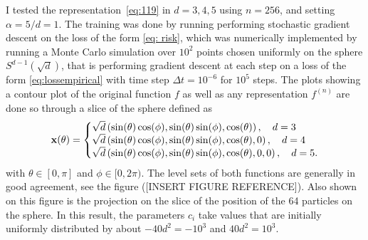\documentclass{article}
\begin{document}
I tested the representation~\eqref{eq:119} in $d=3,4,5$ using $n=256$, and setting $\alpha = 5/d= 1$. The training was done
by running performing stochastic gradient descent on the loss of the form \ref{eq: risk}, which was numerically implemented by running a Monte Carlo simulation over $ 10^2$ points chosen uniformly on the sphere $ S^{d-1}(\sqrt{d})$, that is performing gradient descent at each step on a loss of the form \ref{eq:lossempirical} with
time step $\Delta t = 10^{-6}$ for $10^5$ steps. The plots
showing a contour plot of the original function $f$
as well as any representation $f^{(n)}$ are done so through a slice of the
sphere defined as
%
\begin{equation}
  \label{eq:slice}
  \mathbf{x}(\theta) =\left\lbrace
  \begin{array}{@{}l@{}}
       \sqrt{d} \left(\sin(\theta)\cos(\phi),
    \sin(\theta)\sin(\phi),
    \cos(\theta)\right), \quad d = 3\\
\sqrt{d} \left(\sin(\theta)\cos(\phi),
    \sin(\theta)\sin(\phi),
    \cos(\theta),0\right), \quad d = 4\\
      \sqrt{d} \left(\sin(\theta)\cos(\phi),
    \sin(\theta)\sin(\phi),
    \cos(\theta),0,0\right), \quad d = 5.
  \end{array}\right. 
\end{equation}%
with $\theta\in[0,\pi]$ and $\phi\in [0,2\pi)$. The level sets of both functions are generally in good agreement, see the figure ([INSERT FIGURE REFERENCE]). Also shown on
this figure is the projection on the slice of the position of the 64
particles on the sphere. In this result, the parameters $c_i$ take
values that are initially uniformly distributed by about
$-40 d^2 = -10^3$ and $40 d^2 = 10^3$.
 
\end{document}
